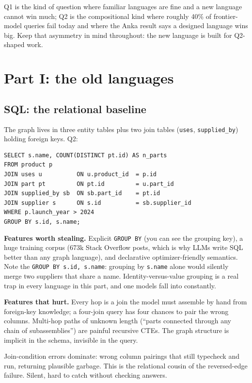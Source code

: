\documentclass[11pt]{article}
\begin{document}
Q1 is the kind of question where familiar languages are fine and a new language cannot win much; Q2 is the compositional kind where roughly 40\% of frontier-model queries fail today and where the Anka result says a designed language wins big. Keep that asymmetry in mind throughout: the new language is built for Q2-shaped work.

\section{Part I: the old languages}

\subsection{SQL: the relational baseline}

The graph lives in three entity tables plus two join tables (\texttt{uses}, \texttt{supplied\_by}) holding foreign keys. Q2:

\begin{lstlisting}[style=old,morekeywords={SELECT,FROM,JOIN,ON,WHERE,GROUP,BY,COUNT,DISTINCT,AS,AND}]
SELECT s.name, COUNT(DISTINCT pt.id) AS n_parts
FROM product p
JOIN uses u          ON u.product_id  = p.id
JOIN part pt         ON pt.id         = u.part_id
JOIN supplied_by sb  ON sb.part_id    = pt.id
JOIN supplier s      ON s.id          = sb.supplier_id
WHERE p.launch_year > 2024
GROUP BY s.id, s.name;
\end{lstlisting}

\textbf{Features worth stealing.} Explicit \texttt{GROUP BY} (you can see the grouping key), a huge training corpus (673k Stack Overflow posts, which is why LLMs write SQL better than any graph language), and declarative optimizer-friendly semantics. Note the \texttt{GROUP BY s.id, s.name}: grouping by \texttt{s.name} alone would silently merge two suppliers that share a name. Identity-versus-value grouping is a real trap in every language in this part, and one models fall into constantly.

\textbf{Features that hurt.} Every hop is a join the model must assemble by hand from foreign-key knowledge; a four-join query has four chances to pair the wrong columns. Multi-hop paths of unknown length (``parts connected through any chain of subassemblies'') are painful recursive CTEs. The graph structure is implicit in the schema, invisible in the query.

\begin{failbox}
Join-condition errors dominate: wrong column pairings that still typecheck and run, returning plausible garbage. This is the relational cousin of the reversed-edge failure. Silent, hard to catch without checking answers.
\end{failbox}
\end{document}
